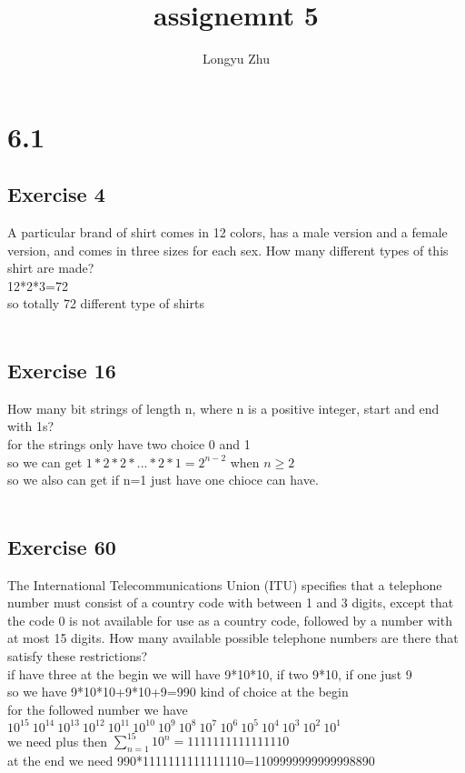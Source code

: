 \documentclass[12pt]{article}
\title{assignemnt 5}
\author{Longyu Zhu}
\begin{document}
\section*{6.1}
\subsection*{Exercise 4}
A particular brand of shirt comes in 12 colors,
has a male version and a female version, 
    and comes in three sizes for each sex.
    How many different types of this shirt are made?\\
12*2*3=72\\
so totally 72 different type of shirts\\
\\
\subsection*{Exercise 16}
How many bit strings of length n, where n is a positive integer, start and end with 1s?\\
for the strings only have two choice 0 and 1\\
so we can get $1*2*2*...*2*1=2^{n-2}$ when $n\geq 2$\\
so we also can get if n=1 just have one chioce can have.\\
\\
\subsection*{Exercise 60}
The International Telecommunications Union (ITU) specifies that a telephone number must consist 
    of a country code with between 1 and 3 digits, except that the code 0 is not available for use as a country code, 
    followed by a number with at most 15 digits. How many available possible telephone numbers are there that satisfy these restrictions?\\
if have three at the begin we will have 9*10*10, if two 9*10, if one just 9\\
so we have 9*10*10+9*10+9=990 kind of choice at the begin\\
for the followed number we have $10^{15}~10^{14}~10^{13}~10^{12}~10^{11}~10^{10}~10^{9}~10^8~10^7~10^6~10^5~10^4~10^3~10^2~10^1$\\
we need plus then $\sum_{n = 1}^{15}10^n=1111111111111110$ \\
at the end we need 990*1111111111111110=1109999999999998890\\
\\
\end{document}
